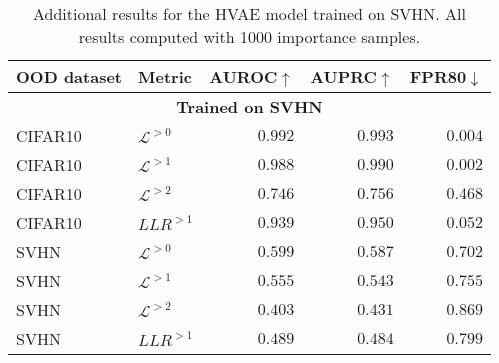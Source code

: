 {\begin{table}[t]
    \caption[Additional results for the HVAE model trained on SVHN]{Additional results for the HVAE model trained on SVHN. All results computed with 1000 importance samples.}
    \centering
    \begin{tabular}{llrrr}
        \toprule
        OOD dataset & Metric & AUROC$\uparrow$ & AUPRC$\uparrow$ & FPR80$\downarrow$ \\
        \midrule
        \multicolumn{5}{c}{\textbf{Trained on SVHN}} \\
        \midrule
        CIFAR10            &  $\mathcal{L}^{>0}$         &  $0.992$  &  $0.993$  &  $0.004$  \\
        CIFAR10            &  $\mathcal{L}^{>1}$         &  $0.988$  &  $0.990$  &  $0.002$  \\
        CIFAR10            &  $\mathcal{L}^{>2}$         &  $0.746$  &  $0.756$  &  $0.468$  \\
        CIFAR10            &  $LLR^{>1}$       &  $0.939$  &  $0.950$  &  $0.052$  \\
        \midrule
        SVHN               &  $\mathcal{L}^{>0}$         &  $0.599$  &  $0.587$  &  $0.702$  \\
        SVHN               &  $\mathcal{L}^{>1}$         &  $0.555$  &  $0.543$  &  $0.755$  \\
        SVHN               &  $\mathcal{L}^{>2}$         &  $0.403$  &  $0.431$  &  $0.869$  \\
        SVHN               &  $LLR^{>1}$       &  $0.489$  &  $0.484$  &  $0.799$  \\
        \bottomrule
    \end{tabular}
    \label{tab_hierarchical:additional-results-svhn}
\end{table}

}
